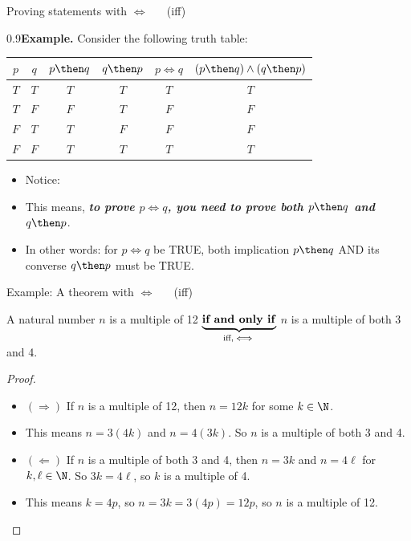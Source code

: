\documentclass[12pt,aspectratio=1610, handout]{beamer}
\begin{document}
\begin{frame}{Proving statements with $\iff$  ~~ (iff)}\vspace{-3mm}
	\begin{center}
		\begin{blockz}{0.9}{\textbf{Example.} Consider the following truth table:} 
			\begin{tabular}{|c|c|c|c|c|c|}
				\hline
				$p$ & $q$ & $p \then q$ & $q \then p$ & $p \iff q$ & $(p \then q) \wedge (q \then p)$\\
				\hline
				$T$ & $T$ & $T$ & $T$ & $T$ & $T$ \\
				\hline
				$T$ & $F$ & $F$ & $T$ &$F$& $F$\\
				\hline
				$F$ & $T$ & $T$& $F$ & $F$& $F$\\ 
				\hline
				$F$ & $F$ & $T$ & $T$ & $T$ & $T$\\
				\hline
			\end{tabular}
		\end{blockz}
		\end{center}\p
			\vspace{2mm}
	\begin{itemize}
		\item[\finger] Notice: \p
		\vspace{3mm}
		\item[\finger] This means, \emph{\textbf{to prove $p \iff q$, you need to prove both $p \then q$ and $q \then p$}}. \p
		\item[\finger] In other words: for $p \iff q$ be TRUE, both implication $p\then q$ AND its converse $q\then p$ must be TRUE.
	\end{itemize}
\end{frame}

\begin{frame}{Example: A theorem with $\iff$  ~~ (iff)}
	\begin{theorem} A natural number $n$ is a multiple of 12 $\underbrace{\text{\textbf{if and only if}}}_{\text{iff,} \iff}$ $n$ is a multiple of both 3 and 4. 
	\end{theorem}
	\vspace{4mm}
	
	\begin{proof}
		\begin{itemize} 
		\item $(\Rightarrow)$ If $n$ is a multiple of 12, then $n = 12k$ for some $k \in \N$.\p
		\item This means $n = 3(4k)$ and $n = 4(3k)$. So $n$ is a multiple of both 3 and 4. \p
		\item $(\Leftarrow)$ If $n$ is a multiple of both 3 and 4, then $n = 3k$ and $n = 4\ell$ for $k,\ell \in \N$. \p So $3k = 4\ell$, so $k$ is a multiple of 4. \p
		\item This means $k = 4p$, so $n = 3k = 3(4p) = 12p$, \p so $n$ is a multiple of 12. 
	\end{itemize}
	\end{proof}
\end{frame}
\end{document}
